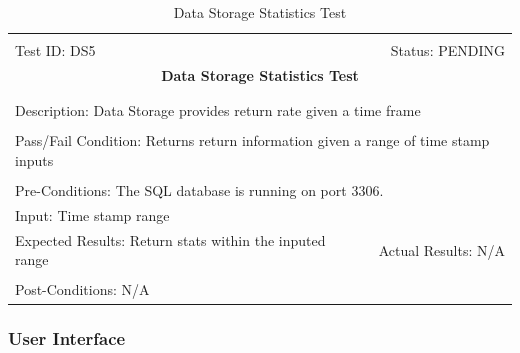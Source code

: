 \documentclass[11pt]{article}
\begin{document}
\begin{center}
\begin{table}[H]
\begin{tabular}{|l r|}\hline&\\[-2mm]
	Test ID: DS5	&Status: PENDING\\[-3mm]
	\multicolumn{2}{|c|}{\textbf{\large{Data Storage Statistics Test}}}\\&\\\hline&\\[-3mm]
	\multicolumn{2}{|p{\textwidth}|}{Description: Data Storage provides return rate given a time frame}\\[1mm]\hline&\\[-3mm]
	\multicolumn{2}{|p{\textwidth}|}{Pass/Fail Condition: Returns return information given a range of time stamp inputs }\\[1mm]\hline&\\[-3mm]
	\multicolumn{2}{|p{\textwidth}|}{Pre-Conditions: The SQL database is running on port 3306.}\\[4mm]
	\multicolumn{2}{|p{\textwidth}|}{Input: Time stamp range }\\[2mm]\hline
	\multicolumn{1}{|p{0.49\textwidth}}{Expected Results: Return stats within the inputed range}	&\multicolumn{1}{|p{0.45\textwidth}|}{Actual Results: N/A}\\\hline&\\[-3mm]
	\multicolumn{2}{|p{\textwidth}|}{Post-Conditions: N/A}\\\hline
\end{tabular}
\caption{Data Storage Statistics Test}
\end{table}
\end{center}

\subsubsection{User Interface} %
\end{document}
